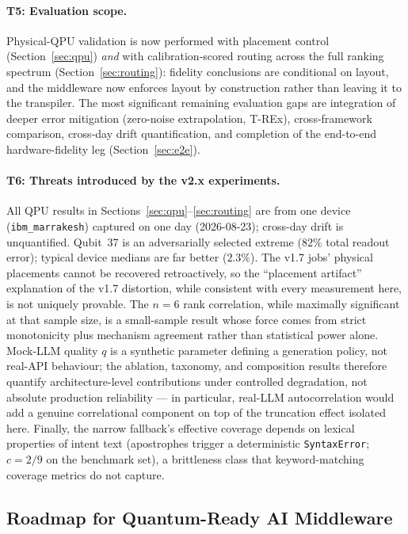 ﻿\documentclass[12pt,a4paper]{article}
\begin{document}
\paragraph{T5: Evaluation scope.} Physical-QPU validation is now performed with placement control (Section~\ref{sec:qpu}) \emph{and} with calibration-scored routing across the full ranking spectrum (Section~\ref{sec:routing}): fidelity conclusions are conditional on layout, and the middleware now enforces layout by construction rather than leaving it to the transpiler. The most significant remaining evaluation gaps are integration of deeper error mitigation (zero-noise extrapolation, T-REx), cross-framework comparison, cross-day drift quantification, and completion of the end-to-end hardware-fidelity leg (Section~\ref{sec:e2e}).

\paragraph{T6: Threats introduced by the v2.x experiments.} All QPU results in Sections~\ref{sec:qpu}--\ref{sec:routing} are from one device (\texttt{ibm\_marrakesh}) captured on one day (2026-08-23); cross-day drift is unquantified. Qubit~37 is an adversarially selected extreme ($82\%$ total readout error); typical device medians are far better ($2.3\%$). The v1.7 jobs' physical placements cannot be recovered retroactively, so the ``placement artifact'' explanation of the v1.7 distortion, while consistent with every measurement here, is not uniquely provable. The $n{=}6$ rank correlation, while maximally significant at that sample size, is a small-sample result whose force comes from strict monotonicity plus mechanism agreement rather than statistical power alone. Mock-LLM quality $q$ is a synthetic parameter defining a generation policy, not real-API behaviour; the ablation, taxonomy, and composition results therefore quantify architecture-level contributions under controlled degradation, not absolute production reliability --- in particular, real-LLM autocorrelation would add a genuine correlational component on top of the truncation effect isolated here. Finally, the narrow fallback's effective coverage depends on lexical properties of intent text (apostrophes trigger a deterministic \texttt{SyntaxError}; $c = 2/9$ on the benchmark set), a brittleness class that keyword-matching coverage metrics do not capture.

\subsection{Roadmap for Quantum-Ready AI Middleware}\label{sec:roadmap}
\end{document}
